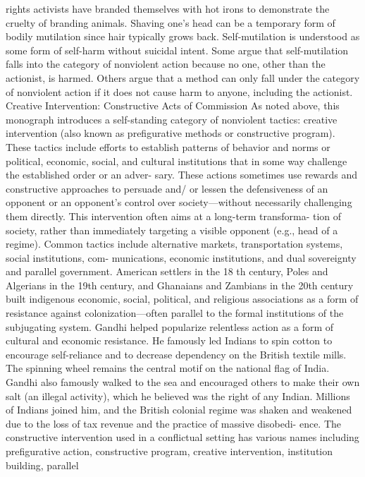 \documentclass[twoside,a4paper,12pt,fleqn,openany]{extbook}
\begin{document}
rights activists have branded themselves with hot irons to demonstrate the cruelty of branding
animals. Shaving one’s head can be a temporary form of bodily mutilation since hair typically
grows back.
Self-mutilation is understood as some form of self-harm without suicidal intent. Some
argue that self-mutilation falls into the category of nonviolent action because no one, other
than the actionist, is harmed. Others argue that a method can only fall under the category of
nonviolent action if it does not cause harm to anyone, including the actionist.
Creative Intervention: Constructive Acts of Commission
As noted above, this monograph introduces a self-standing category of nonviolent tactics:
creative intervention (also known as prefigurative methods or constructive program). These
tactics include efforts to establish patterns of behavior and norms or political, economic,
social, and cultural institutions that in some way challenge the established order or an adver-
sary. These actions sometimes use rewards and constructive approaches to persuade and/
or lessen the defensiveness of an opponent or an opponent’s control over society—without
necessarily challenging them directly. This intervention often aims at a long-term transforma-
tion of society, rather than immediately targeting a visible opponent (e.g., head of a regime).
Common tactics include alternative markets, transportation systems, social institutions, com-
munications, economic institutions, and dual sovereignty and parallel government.
American settlers in the 18 th century, Poles and Algerians in the 19th century, and
Ghanaians and Zambians in the 20th century built indigenous economic, social, political, and
religious associations as a form of resistance against colonization—often parallel to the formal
institutions of the subjugating system. Gandhi helped popularize relentless action as a form
of cultural and economic resistance. He famously led Indians to spin cotton to encourage
self-reliance and to decrease dependency on the British textile mills. The spinning wheel
remains the central motif on the national flag of India. Gandhi also famously walked to the
sea and encouraged others to make their own salt (an illegal activity), which he believed was
the right of any Indian. Millions of Indians joined him, and the British colonial regime was
shaken and weakened due to the loss of tax revenue and the practice of massive disobedi-
ence. The constructive intervention used in a conflictual setting has various names including
prefigurative action, constructive program, creative intervention, institution building, parallel
\end{document}
